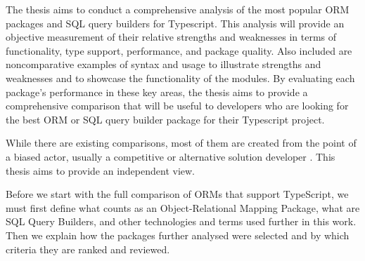 The thesis aims to conduct a comprehensive analysis of the most popular ORM
packages and SQL query builders for Typescript. This analysis will provide an
objective measurement of their relative strengths and weaknesses in terms of
functionality, type support, performance, and package quality. Also included are
noncomparative examples of syntax and usage to illustrate strengths and
weaknesses and to showcase the functionality of the modules. By evaluating each
package's performance in these key areas, the thesis aims to provide a
comprehensive comparison that will be useful to developers who are looking for
the best ORM or SQL query builder package for their Typescript project.

While there are existing comparisons, most of them are created from the point of
a biased actor, usually a competitive or alternative solution developer
\cite{drizzleComparison} \cite{imdbBench}. This thesis aims to provide an
independent view.

Before we start with the full comparison of ORMs that support TypeScript, we
must first define what counts as an Object-Relational Mapping Package, what are
SQL Query Builders, and other technologies and terms used further in this work.
Then we explain how the packages further analysed were selected and by which
criteria they are ranked and reviewed.

